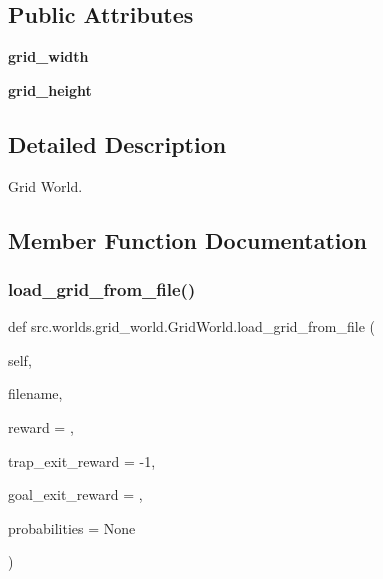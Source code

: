 \subsection*{Public Attributes}
\begin{DoxyCompactItemize}
\item 
\mbox{\label{classsrc_1_1worlds_1_1grid__world_1_1_grid_world_a730e70e132a997b505c02d60556ecb1e}} 
{\bfseries grid\+\_\+width}
\item 
\mbox{\label{classsrc_1_1worlds_1_1grid__world_1_1_grid_world_a0c1d14f392e1a056fbb320c0c88e719c}} 
{\bfseries grid\+\_\+height}
\end{DoxyCompactItemize}


\subsection{Detailed Description}
Grid World. 

\subsection{Member Function Documentation}
\mbox{\label{classsrc_1_1worlds_1_1grid__world_1_1_grid_world_a0d325c5372f0c9c5d98f17e896fb0d5f}} 
\subsubsection{\texorpdfstring{load\+\_\+grid\+\_\+from\+\_\+file()}{load\_grid\_from\_file()}}
{\footnotesize\ttfamily def src.\+worlds.\+grid\+\_\+world.\+Grid\+World.\+load\+\_\+grid\+\_\+from\+\_\+file (\begin{DoxyParamCaption}\item[{}]{self,  }\item[{}]{filename,  }\item[{}]{reward = {},  }\item[{}]{trap\+\_\+exit\+\_\+reward = {\ttfamily -\/1},  }\item[{}]{goal\+\_\+exit\+\_\+reward = {},  }\item[{}]{probabilities = {\ttfamily None} }\end{DoxyParamCaption})}




